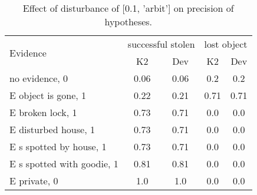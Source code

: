 \begin{table}\begin{tabular}{l|cc|cc}\toprule\multirow{2}{*}{Evidence} & \multicolumn{2}{c}{successful stolen}& \multicolumn{2}{c}{lost object}\\& {K2} & {Dev}& {K2} & {Dev}\\\midrule
no evidence, 0 & 0.06&0.06&0.2&0.2\\E object is gone, 1 & 0.22&0.21&0.71&0.71\\E broken lock, 1 & 0.73&0.71&0.0&0.0\\E disturbed house, 1 & 0.73&0.71&0.0&0.0\\E s spotted by house, 1 & 0.73&0.71&0.0&0.0\\E s spotted with goodie, 1 & 0.81&0.81&0.0&0.0\\E private, 0 & 1.0&1.0&0.0&0.0\\\bottomrule\end{tabular}\caption{Effect of disturbance of [0.1, 'arbit'] on precision of hypotheses.}\end{table}
